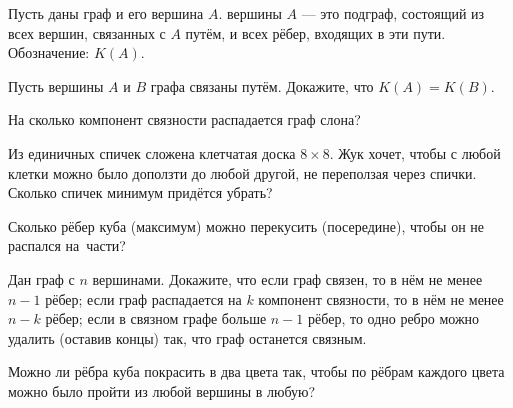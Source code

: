 \documentclass[12pt,a4paper]{article}
\begin{document}



Пусть даны граф и его вершина $A$.  вершины $A$ --- это подграф, состоящий из всех вершин, связанных с $A$  путём, и всех рёбер, входящих в эти пути. %
Обозначение: $K(A)$.

Пусть вершины $A$ и $B$ графа связаны путём. Докажите, что $K(A)=K(B)$.

На сколько компонент связности распадается граф слона?

Из единичных спичек сложена клетчатая доска $8\times8$. Жук хочет, чтобы с любой клетки можно было доползти до любой другой, не переползая через спички.
Сколько спичек минимум придётся убрать?

Сколько рёбер куба (максимум) можно перекусить (посередине), чтобы он не распался на~части?


Дан граф с $n$ вершинами. Докажите, что
 если граф связен, то в нём не менее $n-1$ рёбер;
 если граф распадается на $k$ компонент связности, то в нём не менее $n-k$ рёбер;
 если в связном графе больше $n-1$ рёбер, то одно ребро можно удалить (оставив концы) так, что граф останется связным.

Можно ли рёбра куба покрасить в два цвета так, чтобы по рёбрам каждого цвета можно было пройти из любой вершины в любую?






\end{document}
